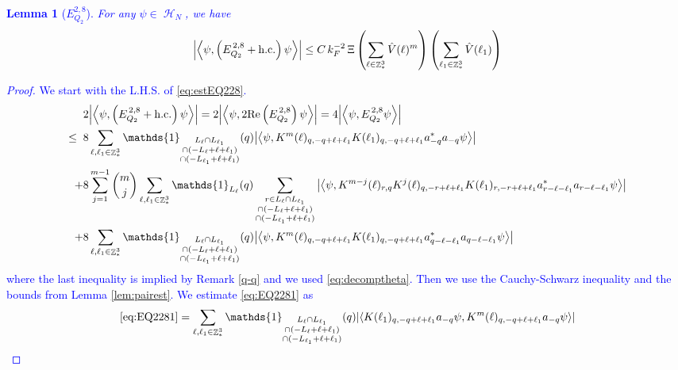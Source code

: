 \documentclass[sn-mathphys, Numbered ,a4paper]{sn-jnl}%
\DeclareMathOperator{\Z}{\mathbb{Z}}
\DeclareMathOperator{\HH}{\mathcal{H}}
\newcommand{\eva}[1]{\left\langle #1 \right\rangle}
\theoremstyle{plain}
\newtheorem{lemma}[theorem]{Lemma}
\theoremstyle{definition}
\theoremstyle{remark}
\theoremstyle{plain}
\theoremstyle{definition}
\theoremstyle{remark}
\begin{document}
\textcolor{blue}{\begin{lemma}[$E_{Q_2}^{2,8}$]\label{lem:EQ228}
For any $\psi \in \HH_N$, we have
\begin{align}
	\abs{\eva{\psi,\left(E^{\,2,8}_{Q_2}+\mathrm{h.c.}\right) \psi }}
		\leq  C\, k_{F}^{-2}\, \Xi \left(\sum\limits_{\ell \in \Z^3_*} \hat{V}(\ell)^m \right) \left(\sum\limits_{\ell_1 \in \Z^3_*} \hat{V}(\ell_1) \right) \label{eq:estEQ228}
	\end{align}
\end{lemma}
\begin{proof}
We start with the L.H.S. of \eqref{eq:estEQ228}.
\begin{align}
	&2\abs{\eva{\psi,\left(E^{\,2,8}_{Q_2}+\mathrm{h.c.}\right) \psi }} = 2\abs{\eva{\psi,2\mathrm{Re}\left(E^{\,2,8}_{Q_2}\right) \psi }} = 4\abs{\eva{\psi, E^{\,2,8}_{Q_2} \psi }}\nonumber\\
	\leq\;\;&8 \sum\limits_{\ell, \ell_1\in \Z^3_*} \mathds{1}_{\substack{L_{\ell}\cap L_{\ell_1}\\\cap (-L_{\ell}+\ell+\ell_1) \\ \cap (-L_{\ell_1}+\ell+\ell_1)}}(q) \abs{\eva{\psi, K^m(\ell)_{q,-q+\ell+\ell_1}K(\ell_1)_{q,-q+\ell+\ell_1} a^*_{-q}a_{-q} \psi}} \label{eq:EQ2281}\\
	\;+&8 \sum\limits_{j=1}^{m-1} {{m}\choose j} \sum\limits_{\ell, \ell_1\in \Z^3_*}\mathds{1}_{L_{\ell}}(q) \sum\limits_{\substack{r\in L_{\ell} \cap L_{\ell_1}\\\cap (-L_{\ell}+\ell+\ell_1) \\ \cap (-L_{\ell_1}+\ell+\ell_1)}}  \abs{\eva{\psi, K^{m-j}(\ell)_{r,q} K^j(\ell)_{q,-r+\ell+\ell_1} K(\ell_1)_{r,-r+\ell+\ell_1} a^*_{r-\ell-\ell_1}a_{r-\ell-\ell_1} \psi }} \label{eq:EQ2282}\\
	\;+&8\sum\limits_{\ell, \ell_1\in \Z^3_*} \mathds{1}_{\substack{L_{\ell}\cap L_{\ell_1}\\\cap (-L_{\ell}+\ell+\ell_1) \\ \cap (-L_{\ell_1}+\ell+\ell_1)}}(q)  \abs{\eva{\psi, K^m(\ell)_{q,-q+\ell+\ell_1} K(\ell_1)_{q,-q+\ell+\ell_1} a^*_{q-\ell-\ell_1}a_{q-\ell-\ell_1} \psi}} \label{eq:EQ2283}
\end{align}
where the last inequality is implied by Remark \ref{q-q} and we used \eqref{eq:decomptheta}. Then we use the Cauchy-Schwarz inequality and the bounds from Lemma \ref{lem:pairest}.
We estimate \eqref{eq:EQ2281} as 
\begin{align}
	\eqref{eq:EQ2281}
	&= \sum\limits_{\ell, \ell_1\in \Z^3_*} \mathds{1}_{\substack{L_{\ell}\cap L_{\ell_1}\\\cap (-L_{\ell}+\ell+\ell_1) \\ \cap (-L_{\ell_1}+\ell+\ell_1)}}(q) \abs{\eva{ K(\ell_1)_{q,-q+\ell+\ell_1} a_{-q} \psi, K^m(\ell)_{q,-q+\ell+\ell_1} a_{-q} \psi }}\nonumber\\

\end{align}
\end{proof}}
\end{document}
